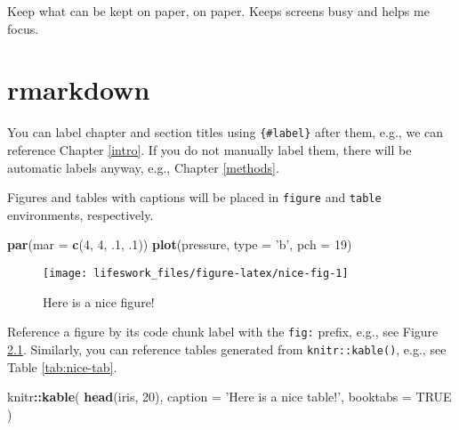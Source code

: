 \documentclass[]{book}
\newenvironment{Shaded}{\begin{snugshade}}{\end{snugshade}}
\newcommand{\DataTypeTok}[1]{\textcolor[rgb]{0.13,0.29,0.53}{#1}}
\newcommand{\DecValTok}[1]{\textcolor[rgb]{0.00,0.00,0.81}{#1}}
\newcommand{\FloatTok}[1]{\textcolor[rgb]{0.00,0.00,0.81}{#1}}
\newcommand{\KeywordTok}[1]{\textcolor[rgb]{0.13,0.29,0.53}{\textbf{#1}}}
\newcommand{\NormalTok}[1]{#1}
\newcommand{\OperatorTok}[1]{\textcolor[rgb]{0.81,0.36,0.00}{\textbf{#1}}}
\newcommand{\OtherTok}[1]{\textcolor[rgb]{0.56,0.35,0.01}{#1}}
\newcommand{\StringTok}[1]{\textcolor[rgb]{0.31,0.60,0.02}{#1}}
\begin{document}
Keep what can be kept on paper, on paper. Keeps screens busy and helps me focus.

\hypertarget{section-1}{%
\section{}\label{section-1}}

\hypertarget{rmarkdown}{%
\chapter{rmarkdown}\label{rmarkdown}}

You can label chapter and section titles using \texttt{\{\#label\}} after them, e.g., we can reference Chapter \ref{intro}. If you do not manually label them, there will be automatic labels anyway, e.g., Chapter \ref{methods}.

Figures and tables with captions will be placed in \texttt{figure} and \texttt{table} environments, respectively.

\begin{Shaded}
\begin{Highlighting}[]
\KeywordTok{par}\NormalTok{(}\DataTypeTok{mar =} \KeywordTok{c}\NormalTok{(}\DecValTok{4}\NormalTok{, }\DecValTok{4}\NormalTok{, }\FloatTok{.1}\NormalTok{, }\FloatTok{.1}\NormalTok{))}
\KeywordTok{plot}\NormalTok{(pressure, }\DataTypeTok{type =} \StringTok{'b'}\NormalTok{, }\DataTypeTok{pch =} \DecValTok{19}\NormalTok{)}
\end{Highlighting}
\end{Shaded}

\begin{figure}

{\centering \texttt{[image: lifeswork\_files/figure-latex/nice-fig-1]} 

}

\caption{Here is a nice figure!}\label{fig:nice-fig}
\end{figure}

Reference a figure by its code chunk label with the \texttt{fig:} prefix, e.g., see Figure \ref{fig:nice-fig}. Similarly, you can reference tables generated from \texttt{knitr::kable()}, e.g., see Table \ref{tab:nice-tab}.

\begin{Shaded}
\begin{Highlighting}[]
\NormalTok{knitr}\OperatorTok{::}\KeywordTok{kable}\NormalTok{(}
  \KeywordTok{head}\NormalTok{(iris, }\DecValTok{20}\NormalTok{), }\DataTypeTok{caption =} \StringTok{'Here is a nice table!'}\NormalTok{,}
  \DataTypeTok{booktabs =} \OtherTok{TRUE}
\NormalTok{)}
\end{Highlighting}
\end{Shaded}
\end{document}
